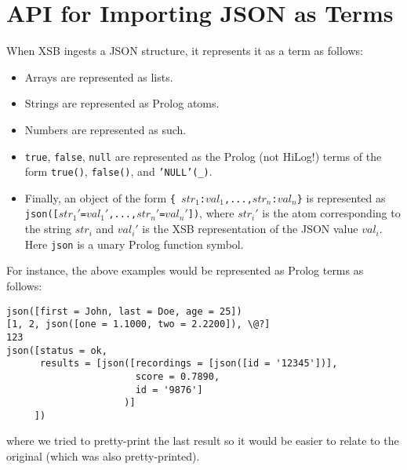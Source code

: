 \section{API for Importing JSON  as Terms}

When XSB ingests a JSON structure, it represents it as a term as follows:
\begin{itemize}
\item  Arrays are represented as lists.
\item  Strings are represented as Prolog atoms.
\item  Numbers are represented as such.
\item  \texttt{true}, \texttt{false}, \texttt{null} are represented as the
  Prolog (not HiLog!) terms of the form \texttt{true()},
  \texttt{false()}, and \texttt{'NULL'(\_)}.
\item Finally, an object of the form \texttt{\{
    $str_1$:$val_1$,...,$str_n$:$val_n$\}} is represented as
  \texttt{json([$str_1'$=$val_1'$,...,$str_n'$=$val_n'$])}, where
  $str_i'$ is the atom corresponding to the string $str_i$ and $val_i'$ is
  the XSB representation of the JSON value $val_i$.
  Here \texttt{json} is a unary Prolog function symbol.
\end{itemize}
For instance, the above examples would be represented as Prolog terms as follows:
\begin{verbatim}
json([first = John, last = Doe, age = 25])
[1, 2, json([one = 1.1000, two = 2.2200]), \@?]
123
json([status = ok,
      results = [json([recordings = [json([id = '12345'])],
                       score = 0.7890,
                       id = '9876']
                     )]
     ])
\end{verbatim}
where we tried to pretty-print the last result so it would be easier to
relate to the original (which was also pretty-printed).

